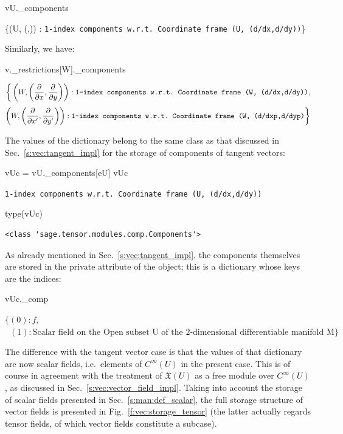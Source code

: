 \begin{NBin}
vU._components
\end{NBin}
\begin{NBoutM}
\left\{\left(U, \left(,\right)\right) :
\mbox{\texttt{1-index components w.r.t.~Coordinate frame (U, (d/dx,d/dy))}}\right\}
\end{NBoutM}
Similarly, we have:
\begin{NBin}
v._restrictions[W]._components
\end{NBin}
\begin{NBout}
\[
\bigg\{\left(W, \left(\frac{\partial}{\partial x },\frac{\partial}{\partial y }\right)\right) :
\mbox{\texttt{1-index components w.r.t.~Coordinate frame (W, (d/dx,d/dy))}},
\]
\[
\left(W, \left(\frac{\partial}{\partial {x'} },\frac{\partial}{\partial {y'} }\right)\right) :
\mbox{\texttt{1-index components w.r.t.~Coordinate frame (W, (d/dxp,d/dyp)}}
\bigg\}
\]
\end{NBout}
The values of the dictionary  belong to the same class
 as that discussed in Sec.~\ref{s:vec:tangent_impl} for
the storage of components of tangent vectors:
\begin{NBin}
vUc = vU._components[eU]
vUc
\end{NBin}
\begin{NBout}
\texttt{1-index components w.r.t.~Coordinate frame (U, (d/dx,d/dy))}
\end{NBout}
\begin{NBin}
type(vUc)
\end{NBin}
\begin{NBout}
\begin{verbatim}
<class 'sage.tensor.modules.comp.Components'>
\end{verbatim}
\end{NBout}
As already mentioned in Sec.~\ref{s:vec:tangent_impl}, the components themselves are stored
in the private attribute  of the  object; this is a dictionary
whose keys are the indices:
\begin{NBin}
vUc._comp
\end{NBin}
\begin{NBout}
$\displaystyle
\big\{\left(0\right) : f, $\\
$\displaystyle
\phantom{x}\left(1\right) : \mbox{Scalar field on the Open subset U of the 2-dimensional differentiable manifold M}\big\}$
\end{NBout}
The difference with the tangent vector case is that the values of that dictionary are now scalar fields, i.e.\ elements of $C^\infty(U)$ in the present case. This is of course in agreement with the treatment of $\mathfrak{X}(U)$ as a free module over $C^\infty(U)$,
as discussed in Sec.~\ref{s:vec:vector_field_impl}.
Taking into account the storage of scalar fields presented in Sec.~\ref{s:man:def_scalar},
the full storage structure of vector fields is presented in Fig.~\ref{f:vec:storage_tensor}
(the latter actually regards tensor fields, of which vector fields constitute a subcase).

